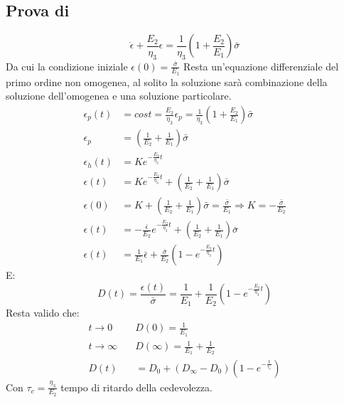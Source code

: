 \subsection{Prova di }
\begin{equation}
\dot{\epsilon} + \frac{E_2}{\eta_3}\epsilon = \frac{1}{\eta_3}\left(1+\frac{E_2}{E_1}\right)\bar{\sigma}
\end{equation}
Da cui la condizione iniziale $\epsilon(0) = \frac{\bar{\sigma}}{E_1}$
Resta un'equazione differenziale del primo ordine non omogenea, al solito la soluzione sarà combinazione della soluzione dell'omogenea e una soluzione particolare.
\begin{equation}
\begin{split}
\epsilon_p(t) &= cost = \frac{E_2}{\eta_3}\epsilon_p = \frac{1}{\eta_3}\left(1+\frac{E_2}{E_1}\right)\bar{\sigma}\\
\epsilon_p &= \left(\frac{1}{E_2} + \frac{1}{E_1}\right)\bar{\sigma}\\
\epsilon_h(t) &= K e^{-\frac{E_2}{\eta_3}t}\\
\epsilon(t) &= K e^{-\frac{E_2}{\eta_3}t} + \left(\frac{1}{E_2} + \frac{1}{E_1}\right)\bar{\sigma}\\
\epsilon(0) &= K + \left(\frac{1}{E_2} + \frac{1}{E_1}\right)\bar{\sigma} = \frac{\bar{\sigma}}{E_1} \Rightarrow K = -\frac{\bar{\sigma}}{E_2}\\
\epsilon(t) &= -\frac{\bar{\epsilon}}{E_2}e^{-\frac{E_2}{\eta_3}t} + \left(\frac{1}{E_2} + \frac{1}{E_1}\right)\bar{\sigma}\\
\epsilon(t) &= \frac{1}{E_1}\bar{\epsilon} + \frac{\bar{\sigma}}{E_2}\left(1-e^{-\frac{E_2}{\eta_3}t}\right)
\end{split}
\end{equation}
E:
\begin{equation}
D(t) = \frac{\epsilon(t)}{\bar{\sigma}} = \frac{1}{E_1} + \frac{1}{E_2}\left(1-e^{-\frac{E_2}{\eta_3}t}\right)
\end{equation}
Resta valido che:
\begin{equation}
\begin{split}
t \rightarrow 0 \quad &D(0) = \frac{1}{E_1}\\
t \rightarrow \infty \quad &D(\infty) = \frac{1}{E_1} + \frac{1}{E_2}\\
D(t) &= D_0 + (D_{\infty} - D_0) \left(1 - e^{-\frac{t}{\tau_c}}\right)
\end{split}
\end{equation}
Con $\tau_c = \frac{\eta_3}{E_2}$ tempo di ritardo della cedevolezza.

